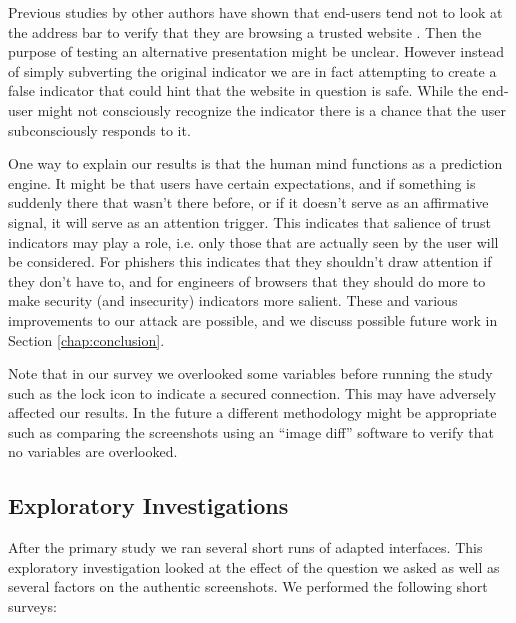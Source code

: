 \documentclass[twoside,letterpaper]{soups}
\begin{document}

Previous studies by other authors have shown that end-users tend not to look at the address bar to verify that they are browsing a trusted website \cite{emperor}. Then the purpose of testing an alternative presentation might be unclear. However instead of simply subverting the original indicator we are in fact attempting to create a false indicator that could hint that the website in question is safe. While the end-user might not consciously recognize the indicator there is a chance that the user subconsciously responds to it.

One way to explain our results is that the human mind functions as a prediction engine. It might be that users have certain expectations, and if something is suddenly there that wasn't there before,  or if it doesn't serve as an affirmative signal, it will serve as an attention trigger. This indicates that salience of trust indicators may play a role, i.e. only those that are actually seen by the user will be considered. For phishers this indicates that they shouldn't draw attention if they don't have to, and for engineers of browsers that they should do more to make security (and insecurity) indicators more salient. These and various improvements to our attack are possible, and we discuss possible future work in Section \ref{chap:conclusion}. %

Note that in our survey we overlooked some variables before running the study such as the lock icon to indicate a secured connection. This may have adversely affected our results. In the future a different methodology might be appropriate such as comparing the screenshots using an ``image diff'' software to verify that no variables are overlooked.

\subsection{Exploratory Investigations} \label{sect:exploratory}

After the primary study we ran several short runs of adapted interfaces. This exploratory investigation looked at the effect of the question we asked as well as several factors on the authentic screenshots. We performed the following short surveys:
\end{document}
